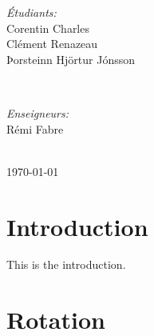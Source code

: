 \documentclass[11pt, a4paper]{article}
\begin{document}
\begin{titlepage}
\begin{minipage}{0.4\textwidth} %
\begin{flushleft} \large %
\emph{Étudiants:}
\\
Corentin Charles
\\
Clément Renazeau
\\
Þorsteinn Hjörtur Jónsson %
\end{flushleft}
\end{minipage}
~
\begin{minipage}{0.4\textwidth}
\begin{flushright} \large %
\vspace{-1cm}
\emph{Enseigneurs:} 
\\
Rémi Fabre
\\

\end{flushright}
\end{minipage}\\[3cm]
\nopagebreak      %
{\large \today}\\[3cm] %
\null
\end{titlepage}
\clearpage
\section{Introduction}
This is the introduction.\\
\clearpage
\section{Rotation}
\end{document}
